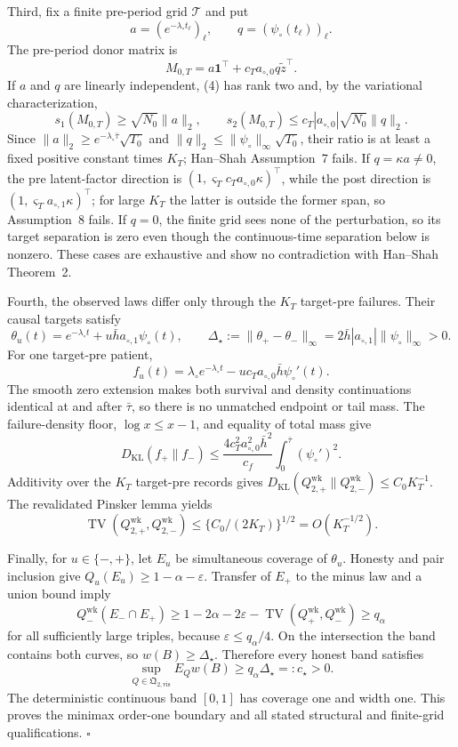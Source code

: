 Third, fix a finite pre-period grid \(\mathcal T\) and put
\[
 a=(e^{-\lambda_\circ t_\ell})_\ell,
 \qquad q=(\psi_\circ(t_\ell))_\ell.
\]
The pre-period donor matrix is
\[
 M_{0,T}=a\mathbf1^\top+c_Ta_{\circ,0}q\widetilde z^\top. \tag{4}
\]
If \(a\) and \(q\) are linearly independent, (4) has rank two and, by the variational characterization,
\[
 s_1(M_{0,T})\ge\sqrt{N_0}\|a\|_2,
 \qquad s_2(M_{0,T})\le c_T|a_{\circ,0}|\sqrt{N_0}\|q\|_2. \tag{5}
\]
Since \(\|a\|_2\ge e^{-\lambda_\circ\bar\tau}\sqrt{T_0}\) and \(\|q\|_2\le\|\psi_\circ\|_\infty\sqrt{T_0}\), their ratio is at least a fixed positive constant times \(K_T\); Han--Shah Assumption~7 fails. If \(q=\kappa a\ne0\), the pre latent-factor direction is \((1,\varsigma_Tc_Ta_{\circ,0}\kappa)^\top\), while the post direction is \((1,\varsigma_Ta_{\circ,1}\kappa)^\top\); for large \(K_T\) the latter is outside the former span, so Assumption~8 fails. If \(q=0\), the finite grid sees none of the perturbation, so its target separation is zero even though the continuous-time separation below is nonzero. These cases are exhaustive and show no contradiction with Han--Shah Theorem~2.

Fourth, the observed laws differ only through the \(K_T\) target-pre failures. Their causal targets satisfy
\[
 \theta_u(t)=e^{-\lambda_\circ t}+u\bar h a_{\circ,1}\psi_\circ(t),
 \qquad
 \Delta_\star:=\|\theta_+-\theta_-\|_\infty
 =2\bar h|a_{\circ,1}|\|\psi_\circ\|_\infty>0.          \tag{6}
\]
For one target-pre patient,
\[
 f_u(t)=\lambda_\circ e^{-\lambda_\circ t}
 -u c_Ta_{\circ,0}\bar h\psi_\circ'(t).                  \tag{7}
\]
The smooth zero extension makes both survival and density continuations identical at and after \(\bar\tau\), so there is no unmatched endpoint or tail mass. The failure-density floor, \(\log x\le x-1\), and equality of total mass give
\[
 D_{\mathrm{KL}}(f_+\|f_-)
 \le\frac{4c_T^2a_{\circ,0}^2\bar h^2}{c_f}
 \int_0^{\bar\tau}(\psi_\circ')^2.                       \tag{8}
\]
Additivity over the \(K_T\) target-pre records gives \(D_{\mathrm{KL}}(Q_{2,+}^{\mathrm{wk}}\|Q_{2,-}^{\mathrm{wk}})\le C_0K_T^{-1}\). The revalidated Pinsker lemma yields
\[
 \operatorname{TV}(Q_{2,+}^{\mathrm{wk}},Q_{2,-}^{\mathrm{wk}})
 \le\{C_0/(2K_T)\}^{1/2}=O(K_T^{-1/2}).                  \tag{9}
\]

Finally, for \(u\in\{-,+\}\), let \(E_u\) be simultaneous coverage of \(\theta_u\). Honesty and pair inclusion give \(Q_u(E_u)\ge1-\alpha-\varepsilon\). Transfer of \(E_+\) to the minus law and a union bound imply
\[
 Q_-^{\mathrm{wk}}(E_-\cap E_+)
 \ge1-2\alpha-2\varepsilon-
 \operatorname{TV}(Q_+^{\mathrm{wk}},Q_-^{\mathrm{wk}})
 \ge q_\alpha                                             \tag{10}
\]
for all sufficiently large triples, because \(\varepsilon\le q_\alpha/4\). On the intersection the band contains both curves, so \(w(B)\ge\Delta_\star\). Therefore every honest band satisfies
\[
 \sup_{Q\in\mathfrak Q_{2,\mathrm{vis}}}E_Qw(B)
 \ge q_\alpha\Delta_\star=:c_\star>0.                   \tag{11}
\]
The deterministic continuous band \([0,1]\) has coverage one and width one. This proves the minimax order-one boundary and all stated structural and finite-grid qualifications. \(\square\)